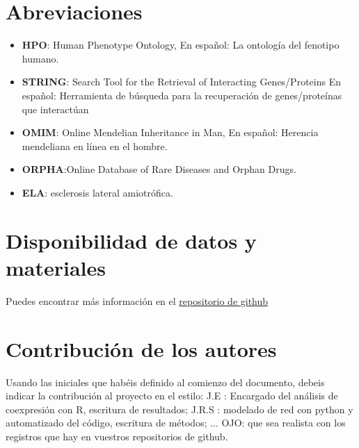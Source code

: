 \documentclass{bmcart}
\begin{document}
	\begin{backmatter}
	
		\section*{Abreviaciones}%
		\begin{itemize}
			\item \textbf{HPO}: Human Phenotype Ontology, En español: La ontología del fenotipo humano.
			\item \textbf{STRING}: Search Tool for the Retrieval of Interacting Genes/Proteins En español: Herramienta de búsqueda para la recuperación de genes/proteínas que interactúan
			\item \textbf{OMIM}: Online Mendelian Inheritance in Man, En español: Herencia mendeliana en línea en el hombre.
			\item \textbf{ORPHA}:Online Database of Rare Diseases and Orphan Drugs.
			\item \textbf{ELA}: esclerosis lateral amiotrófica.
		\end{itemize}
		
		\section*{Disponibilidad de datos y materiales}%
			
			
			Puedes encontrar más información en el \href{https://github.com/Diegodepab/project_template}{repositorio de github}
			 
			
		\section*{Contribución de los autores}
			Usando las iniciales que habéis definido al comienzo del documento, debeis indicar la contribución al proyecto en el estilo:
			J.E : Encargado del análisis de coexpresión con R, escritura de resultados; J.R.S : modelado de red con python y automatizado del código, escritura de métodos; ...
			OJO: que sea realista con los registros que hay en vuestros repositorios de github. 
		
		
		
	
	\end{backmatter}
\end{document}
